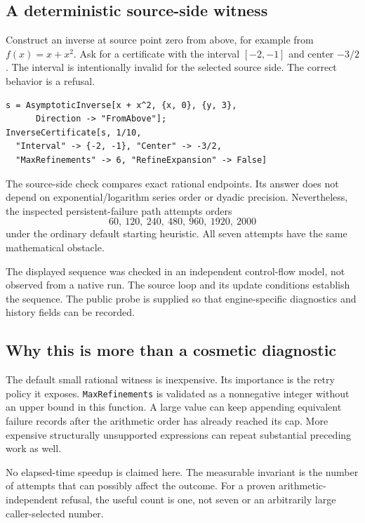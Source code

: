 \documentclass[11pt,a4paper]{article}
\newcommand{\code}[1]{\nolinkurl{#1}}
\begin{document}
\subsection{A deterministic source-side witness}

Construct an inverse at source point zero from above, for example from $f(x)=x+x^2$. Ask for a certificate with the interval $[-2,-1]$ and center $-3/2$. The interval is intentionally invalid for the selected source side. The correct behavior is a refusal.

\begin{lstlisting}
s = AsymptoticInverse[x + x^2, {x, 0}, {y, 3},
      Direction -> "FromAbove"];
InverseCertificate[s, 1/10,
  "Interval" -> {-2, -1}, "Center" -> -3/2,
  "MaxRefinements" -> 6, "RefineExpansion" -> False]
\end{lstlisting}

The source-side check compares exact rational endpoints. Its answer does not depend on exponential/logarithm series order or dyadic precision. Nevertheless, the inspected persistent-failure path attempts orders
\[
60,\ 120,\ 240,\ 480,\ 960,\ 1920,\ 2000
\]
under the ordinary default starting heuristic. All seven attempts have the same mathematical obstacle.

The displayed sequence was checked in an independent control-flow model, not observed from a native run. The source loop and its update conditions establish the sequence. The public probe is supplied so that engine-specific diagnostics and history fields can be recorded.

\subsection{Why this is more than a cosmetic diagnostic}

The default small rational witness is inexpensive. Its importance is the retry policy it exposes. \code{MaxRefinements} is validated as a nonnegative integer without an upper bound in this function. A large value can keep appending equivalent failure records after the arithmetic order has already reached its cap. More expensive structurally unsupported expressions can repeat substantial preceding work as well.\cite{cert}

No elapsed-time speedup is claimed here. The measurable invariant is the number of attempts that can possibly affect the outcome. For a proven arithmetic-independent refusal, the useful count is one, not seven or an arbitrarily large caller-selected number.
\end{document}
